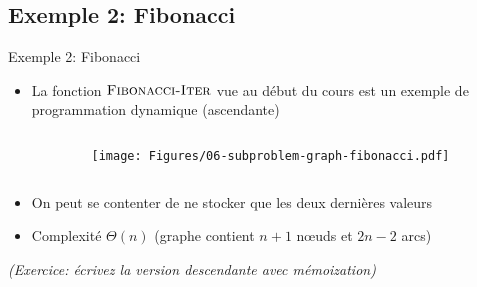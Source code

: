 \subsection{Exemple 2: Fibonacci}

\begin{frame}{Exemple 2: Fibonacci}

\begin{itemize}
\item La fonction $\textnormal{\scshape Fibonacci-Iter}$ vue au début du cours est un
  exemple de programmation dynamique (ascendante)
\end{itemize}

\begin{columns}
\begin{column}{5cm}
\begin{center}\footnotesize
{}
\end{center}
\end{column}
\begin{column}{5cm}
\centerline{\texttt{[image: Figures/06-subproblem-graph-fibonacci.pdf]}}
\end{column}
\end{columns}

\begin{itemize}
\item On peut se contenter de ne stocker que les deux dernières valeurs
\item Complexité $\Theta(n)$ (graphe contient $n+1$ n\oe uds et $2n-2$ arcs)
\end{itemize}
{\it (Exercice: écrivez la version descendante avec mémoization)}

\end{frame}

